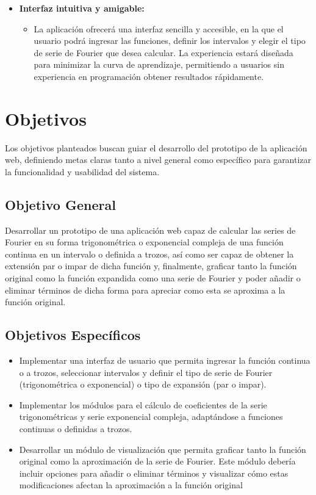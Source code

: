 \begin{itemize}
	\item \textbf{Interfaz intuitiva y amigable:}
	\vspace{-10pt}
	\begin{itemize}
		\item  La aplicación ofrecerá una interfaz sencilla y accesible, en la que el usuario podrá ingresar las funciones, definir los intervalos y elegir el tipo de serie de Fourier que desea calcular. La experiencia estará diseñada para minimizar la curva de aprendizaje, permitiendo a usuarios sin experiencia en programación obtener resultados rápidamente.
	\end{itemize}
\end{itemize}

\section{Objetivos}
Los objetivos planteados buscan guiar el desarrollo del prototipo de la aplicación web, definiendo metas claras tanto a nivel general como específico para garantizar la funcionalidad y usabilidad del sistema.

\subsection{Objetivo General}
Desarrollar un prototipo de una aplicación web capaz de calcular las series de Fourier en su forma trigonométrica o exponencial compleja de una función continua en un intervalo o definida a trozos, así como ser capaz de obtener la extensión par o impar de dicha función y, finalmente, graficar tanto la función original como la función expandida como una serie de Fourier y poder añadir o eliminar términos de dicha forma para apreciar como esta se aproxima a la función original.

\subsection{Objetivos Específicos}
\begin{itemize}
	\item Implementar una interfaz de usuario que permita ingresar la función continua o a trozos, seleccionar intervalos y definir el tipo de serie de Fourier (trigonométrica o exponencial) o tipo de expansión (par o impar).
	\item Implementar los módulos para el cálculo de coeficientes de la serie trigonométricas y serie exponencial compleja, adaptándose a funciones continuas o definidas a trozos.
	\item  Desarrollar un módulo de visualización que permita graficar tanto la función original como la
	aproximación de la serie de Fourier. Este módulo debería incluir opciones para añadir o eliminar términos y visualizar cómo estas modificaciones afectan la aproximación a la función original
\end{itemize}
